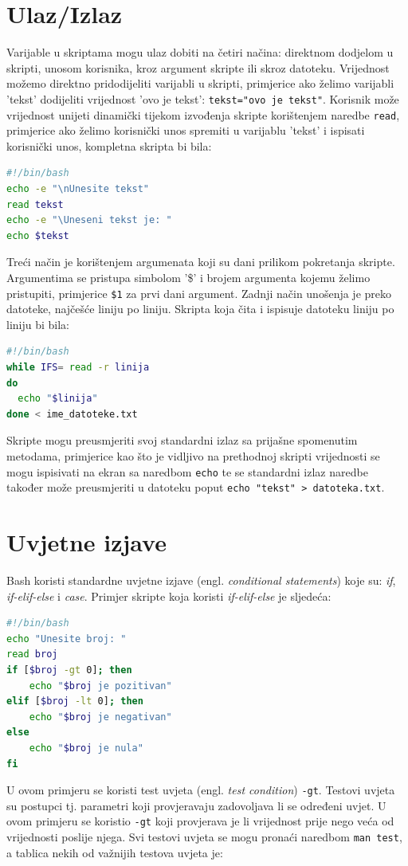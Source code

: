 \documentclass{foi}
\begin{document}
\section{Ulaz/Izlaz}
Varijable u skriptama mogu ulaz dobiti na četiri načina: direktnom dodjelom u skripti, unosom korisnika, kroz argument skripte ili skroz datoteku. Vrijednost možemo direktno pridodijeliti varijabli u skripti, primjerice ako želimo varijabli 'tekst' dodijeliti vrijednost 'ovo je tekst': \verb|tekst="ovo je tekst"|. Korisnik može vrijednost unijeti dinamički tijekom izvođenja skripte korištenjem naredbe \verb|read|, primjerice ako želimo korisnički unos spremiti u varijablu 'tekst' i ispisati korisnički unos, kompletna skripta bi bila:
\begin{lstlisting}[language=bash]
#!/bin/bash
echo -e "\nUnesite tekst"
read tekst
echo -e "\Uneseni tekst je: "
echo $tekst
\end{lstlisting}
\begin{flushleft}
Treći način je korištenjem argumenata koji su dani prilikom pokretanja skripte. Argumentima se pristupa simbolom '\$' i brojem argumenta kojemu želimo pristupiti, primjerice \verb|$1| za prvi dani argument. Zadnji način unošenja je preko datoteke, najčešće liniju po liniju. Skripta koja čita i ispisuje datoteku liniju po liniju bi bila:
\end{flushleft}
\begin{lstlisting}[language=bash]
#!/bin/bash
while IFS= read -r linija
do
  echo "$linija"
done < ime_datoteke.txt
\end{lstlisting}
Skripte mogu preusmjeriti svoj standardni izlaz sa prijašne spomenutim metodama, primjerice kao što je vidljivo na prethodnoj skripti vrijednosti se mogu ispisivati na ekran sa naredbom \verb|echo| te se standardni izlaz naredbe također može preusmjeriti u datoteku poput \verb|echo "tekst" > datoteka.txt|.

\section{Uvjetne izjave}
Bash koristi standardne uvjetne izjave (engl. \textit{conditional statements}) koje su: \textit{if}, \textit{if-elif-else} i \textit{case}. Primjer skripte koja koristi \textit{if-elif-else} je sljedeća:
\begin{lstlisting}[language=bash]
#!/bin/bash
echo "Unesite broj: "
read broj
if [$broj -gt 0]; then
    echo "$broj je pozitivan"
elif [$broj -lt 0]; then
    echo "$broj je negativan"
else
    echo "$broj je nula"
fi
\end{lstlisting}
U ovom primjeru se koristi test uvjeta (engl. \textit{test condition}) \verb|-gt|. Testovi uvjeta su postupci tj. parametri koji provjeravaju zadovoljava li se određeni uvjet. U ovom primjeru se koristio \verb|-gt| koji provjerava je li vrijednost prije nego veća od vrijednosti poslije njega. Svi testovi uvjeta se mogu pronaći naredbom \verb|man test|, a tablica nekih od važnijih testova uvjeta je:
\end{document}

